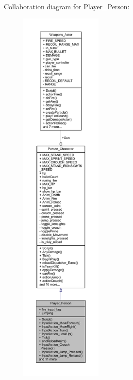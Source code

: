 Collaboration diagram for Player\+\_\+\+Person\+:
\nopagebreak
\begin{figure}[H]
\begin{center}
\leavevmode
\includegraphics[height=550pt]{class_player___person__coll__graph}
\end{center}
\end{figure}
